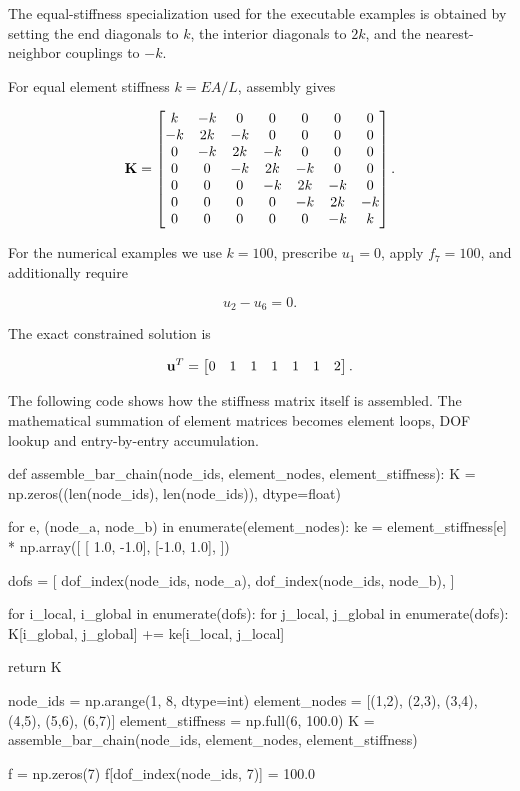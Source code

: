 The equal-stiffness specialization used for the executable examples is obtained
by setting the end diagonals to $k$, the interior diagonals to $2k$, and the
nearest-neighbor couplings to $-k$.

For equal element stiffness $k=EA/L$, assembly gives

\begin{equation}\label{master-stiffness-6-bar}
\mathbf{K}=
\begin{bmatrix}
 k&-k&0&0&0&0&0\\
-k&2k&-k&0&0&0&0\\
0&-k&2k&-k&0&0&0\\
0&0&-k&2k&-k&0&0\\
0&0&0&-k&2k&-k&0\\
0&0&0&0&-k&2k&-k\\
0&0&0&0&0&-k&k
\end{bmatrix}.
\end{equation}

For the numerical examples we use $k=100$, prescribe $u_1=0$, apply
$f_7=100$, and additionally require

\begin{equation}\label{mfc-2-6}
    u_2-u_6=0.
\end{equation}

The exact constrained solution is

\begin{equation}\label{mfc-example-exact-solution}
    \mathbf{u}^T=\begin{bmatrix}0&1&1&1&1&1&2\end{bmatrix}.
\end{equation}

The following code shows how the stiffness matrix itself is assembled. The
mathematical summation of element matrices becomes element loops, DOF lookup and
entry-by-entry accumulation.

\begin{python}
def assemble_bar_chain(node_ids, element_nodes, element_stiffness):
    K = np.zeros((len(node_ids), len(node_ids)), dtype=float)

    for e, (node_a, node_b) in enumerate(element_nodes):
        ke = element_stiffness[e] * np.array([
            [ 1.0, -1.0],
            [-1.0,  1.0],
        ])

        dofs = [
            dof_index(node_ids, node_a),
            dof_index(node_ids, node_b),
        ]

        for i_local, i_global in enumerate(dofs):
            for j_local, j_global in enumerate(dofs):
                K[i_global, j_global] += ke[i_local, j_local]

    return K


node_ids = np.arange(1, 8, dtype=int)
element_nodes = [(1,2), (2,3), (3,4), (4,5), (5,6), (6,7)]
element_stiffness = np.full(6, 100.0)
K = assemble_bar_chain(node_ids, element_nodes, element_stiffness)

f = np.zeros(7)
f[dof_index(node_ids, 7)] = 100.0
\end{python}

